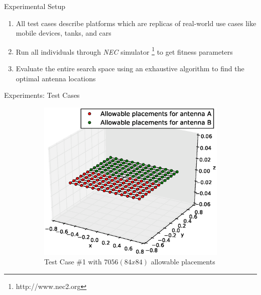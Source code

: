 \documentclass{beamer}
\begin{document}
\begin{frame}[t]{Experimental Setup}
    \begin{enumerate}
        \item All test cases describe platforms which are replicas of real-world use cases like mobile devices, tanks, and cars
        \item Run all individuals through \textit{NEC} simulator \footnote{http://www.nec2.org} to get fitness parameters 
        \item Evaluate the entire search space using an exhaustive algorithm to find the optimal antenna locations
    \end{enumerate}
    \vspace{10mm}
\end{frame}


\begin{frame}{Experiments: Test Cases}
    \begin{figure}
        \centering
        \begin{subfigure}{.5\columnwidth}
            \includegraphics[width=\columnwidth,height=\columnwidth]{../paper/FIG/tc1_figure}%
            \caption*{\tiny Test Case \#1 with $7056 (84x84)$ allowable placements}%
        \end{subfigure}\hfill%
        \begin{subfigure}{.5\columnwidth}

\end{subfigure}
\end{figure}
\end{frame}
\end{document}
